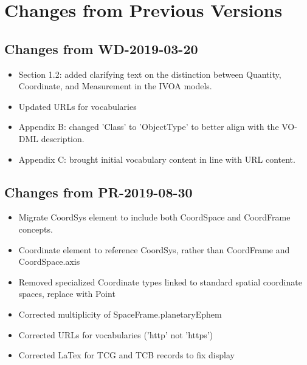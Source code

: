 \pagebreak
\section{Changes from Previous Versions}


\subsection{Changes from WD-2019-03-20}
\begin{itemize} 
  \item Section 1.2: added clarifying text on the distinction between Quantity, Coordinate, and Measurement in the IVOA models.
  \item Updated URLs for vocabularies
  \item Appendix B: changed 'Class' to 'ObjectType' to better align with the VO-DML description.
  \item Appendix C: brought initial vocabulary content in line with URL content.
\end{itemize}
\subsection{Changes from PR-2019-08-30}
\begin{itemize} 
  \item Migrate CoordSys element to include both CoordSpace and CoordFrame concepts.
  \item Coordinate element to reference CoordSys, rather than CoordFrame and CoordSpace.axis
  \item Removed specialized Coordinate types linked to standard spatial coordinate spaces, replace with Point
  \item Corrected multiplicity of SpaceFrame.planetaryEphem
  \item Corrected URLs for vocabularies ('http' not 'https')
  \item Corrected LaTex for TCG and TCB records to fix display 
\end{itemize}
